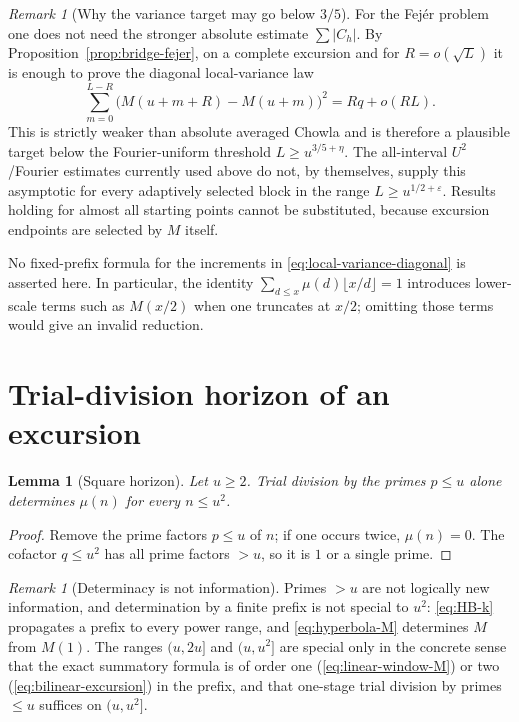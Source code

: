 \documentclass[11pt]{amsart}
\numberwithin{equation}{section}
\theoremstyle{plain}
\newtheorem{lemma}[theorem]{Lemma}
\theoremstyle{definition}
\theoremstyle{remark}
\newtheorem{remark}[theorem]{Remark}
\newcommand{\eps}{\varepsilon}
\begin{document}
\begin{remark}[Why the variance target may go below $3/5$]
\label{rem:variance-target}
For the Fej\'er problem one does not need the stronger absolute estimate
$\sum|C_h|$. By Proposition~\ref{prop:bridge-fejer}, on a complete excursion
and for $R=o(\sqrt L)$ it is enough to prove the diagonal local-variance law
\[
\sum_{m=0}^{L-R}\bigl(M(u+m+R)-M(u+m)\bigr)^2
=Rq+o(RL).
\]
This is strictly weaker than absolute averaged Chowla and is therefore a
plausible target below the Fourier-uniform threshold $L\ge u^{3/5+\eta}$.
The all-interval $U^2$/Fourier estimates currently used above do not, by
themselves, supply this asymptotic for every adaptively selected block in
the range $L\ge u^{1/2+\eps}$. Results holding for almost all starting
points cannot be substituted, because excursion endpoints are selected by
$M$ itself.

No fixed-prefix formula for the increments in
\eqref{eq:local-variance-diagonal} is asserted here. In particular, the
identity $\sum_{d\le x}\mu(d)\lfloor x/d\rfloor=1$ introduces lower-scale
terms such as $M(x/2)$ when one truncates at $x/2$; omitting those terms
would give an invalid reduction.
\end{remark}


\section{Trial-division horizon of an excursion}
\label{sec:prime_horizon}

\begin{lemma}[Square horizon]
\label{lem:square-horizon}
Let $u\ge2$. Trial division by the primes $p\le u$ alone determines $\mu(n)$
for every $n\le u^2$.
\end{lemma}

\begin{proof}
Remove the prime factors $p\le u$ of $n$; if one occurs twice, $\mu(n)=0$.
The cofactor $q\le u^2$ has all prime factors $>u$, so it is $1$ or a single
prime.
\end{proof}

\begin{remark}[Determinacy is not information]
\label{rem:information}
\label{warn:information_language}
Primes $>u$ are not logically new information, and determination by a
finite prefix is not special to $u^2$: \eqref{eq:HB-k} propagates a prefix
to every power range, and \eqref{eq:hyperbola-M} determines $M$ from $M(1)$.
The ranges $(u,2u]$ and $(u,u^2]$ are special only in the concrete sense
that the exact summatory formula is of order one
(\eqref{eq:linear-window-M}) or two (\eqref{eq:bilinear-excursion}) in the
prefix, and that one-stage trial division by primes $\le u$ suffices on
$(u,u^2]$.
\end{remark}
\end{document}
